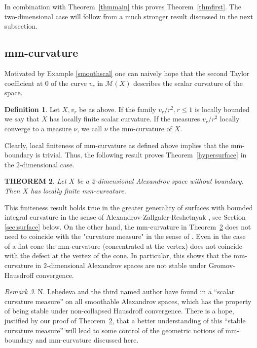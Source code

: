 \documentclass[12pt,leqno]{amsart}
\numberwithin{equation}{section}
\newtheorem{thm}{THEOREM}[section]
\theoremstyle{definition}
\newtheorem{defn}[thm]{Definition}%
\theoremstyle{remark}
\newtheorem{rem}[thm]{Remark}
\newcommand{\tref}[1]{Theorem~\ref{#1}}
\begin{document}
In combination with \tref{thmmain} this proves \tref{thmfirst}. The two-dimensional case will follow from a much stronger result discussed in the next subsection.




\subsection{mm-curvature}
Motivated by Example \ref{smoothscal} one can naively hope that the second Taylor coefficient at $0$ of the
curve $v_r $ in $\mathcal M(X)$ describes the scalar curvature of the space.



\begin{defn}
 Let $X,v_r$ be as above. If the family $v_r /r^2, r\leq 1$ is locally bounded we say that $X$ has locally finite  scalar curvature.
  If the measures $v_r /r^2$ locally converge to a measure $\nu$, we call $\nu$ the mm-curvature of $X$.
\end{defn}


Clearly, local finiteness of mm-curvature as defined above implies that the mm-boundary is trivial.
Thus, the following result proves \tref{hypersurface} in the $2$-dimensional case.


\begin{thm} \label{intsurface}
 Let $X$ be a 2-dimensional Alexandrov space without boundary.
 Then $X$ has locally finite mm-curvature.
\end{thm}


This finiteness result holds true in the greater generality of surfaces  with bounded integral curvature in the sense of Alexandrov-Zallgaler-Reshetnyak \cite{Reshetnyak-GeomIV}, see Section \ref{sec:surface} below. On the other hand, the mm-curvature
in \tref{intsurface} does not need to coincide with the "curvature measure" in the sense of \cite{Reshetnyak-GeomIV}.  Even in the case
of a flat cone the mm-curvature (concentrated at the vertex) does not coincide with the defect at the vertex of the cone.  In particular, this shows that the mm-curvature in $2$-dimensional Alexandrov spaces are not stable under Gromov-Hausdroff convergence.


\begin{rem}
N. Lebedeva and the third named author have found in \cite{LP}  a ``scalar curvature measure'' on all smoothable Alexandrov spaces, which has the property of being stable
under non-collapsed Hausdroff convergence. There is a hope, justified by our proof of  \tref{intsurface}, that a better understanding of this ``stable curvature measure'' will
lead to some control of the geometric notions of mm-boundary and mm-curvature discussed here.
\end{rem}
\end{document}
